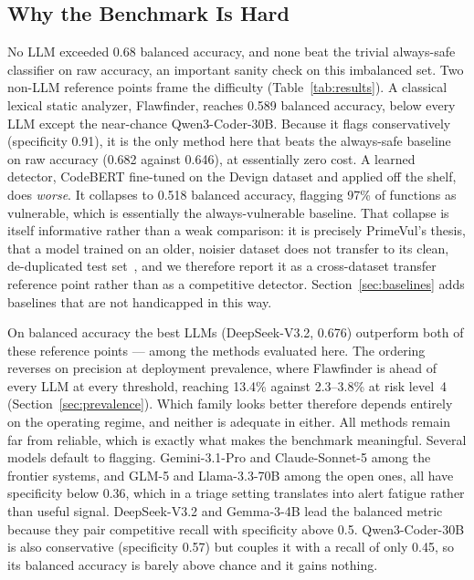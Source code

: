 \documentclass[computers,article,submit,moreauthors]{Definitions/mdpi}
\begin{document}
\subsection{Why the Benchmark Is Hard}
No LLM exceeded 0.68 balanced accuracy, and none beat the trivial always-safe classifier on raw accuracy, an important sanity check on this imbalanced set. Two non-LLM reference points frame the difficulty (Table~\ref{tab:results}). A classical lexical static analyzer, Flawfinder, reaches 0.589 balanced accuracy, below every LLM except the near-chance Qwen3-Coder-30B. Because it flags conservatively (specificity 0.91), it is the only method here that beats the always-safe baseline on raw accuracy (0.682 against 0.646), at essentially zero cost. A learned detector, CodeBERT fine-tuned on the Devign dataset and applied off the shelf, does \emph{worse}. It collapses to 0.518 balanced accuracy, flagging 97\% of functions as vulnerable, which is essentially the always-vulnerable baseline. That collapse is itself informative rather than a weak comparison: it is precisely PrimeVul's thesis, that a model trained on an older, noisier dataset does not transfer to its clean, de-duplicated test set~\citep{primevul,croft,reveal}, and we therefore report it as a cross-dataset transfer reference point rather than as a competitive detector. Section~\ref{sec:baselines} adds baselines that are not handicapped in this way.

On balanced accuracy the best LLMs (DeepSeek-V3.2, 0.676) outperform both of these reference points --- among the methods evaluated here. The ordering reverses on precision at deployment prevalence, where Flawfinder is ahead of every LLM at every threshold, reaching 13.4\% against 2.3--3.8\% at risk level~4 (Section~\ref{sec:prevalence}). Which family looks better therefore depends entirely on the operating regime, and neither is adequate in either. All methods remain far from reliable, which is exactly what makes the benchmark meaningful. Several models default to flagging. Gemini-3.1-Pro and Claude-Sonnet-5 among the frontier systems, and GLM-5 and Llama-3.3-70B among the open ones, all have specificity below 0.36, which in a triage setting translates into alert fatigue rather than useful signal. DeepSeek-V3.2 and Gemma-3-4B lead the balanced metric because they pair competitive recall with specificity above 0.5. Qwen3-Coder-30B is also conservative (specificity 0.57) but couples it with a recall of only 0.45, so its balanced accuracy is barely above chance and it gains nothing.
\end{document}
